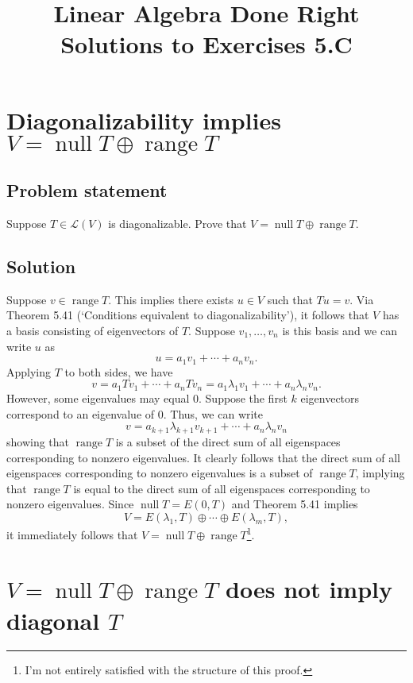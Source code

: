 \documentclass{article}
\title{Linear Algebra Done Right\\Solutions to Exercises 5.C}
\author{}
\date{}
\begin{document}
\maketitle

\section{Diagonalizability implies $V=\operatorname{null}T\oplus\operatorname{range}T$}
\subsection*{Problem statement}
Suppose $T\in\mathcal{L}(V)$ is diagonalizable. 
Prove that $V=\operatorname{null}T\oplus\operatorname{range}T$.

\subsection*{Solution}
Suppose $v\in\operatorname{range}T$. 
This implies there exists $u\in V$ such that $Tu=v$. 
Via Theorem 5.41 (`Conditions equivalent to diagonalizability'), it follows that $V$ has a basis consisting of eigenvectors of $T$. 
Suppose $v_1,\ldots,v_n$ is this basis and we can write $u$ as
\[u=a_1v_1 +\cdots +a_nv_n.\]
Applying $T$ to both sides, we have
\[v=a_1Tv_1 +\cdots +a_nTv_n=a_1\lambda_1v_1 +\cdots + a_n\lambda_n v_n.\]
However, some eigenvalues may equal $0$.
Suppose the first $k$ eigenvectors correspond to an eigenvalue of $0$. 
Thus, we can write
\[v=a_{k+1}\lambda_{k+1}v_{k+1}+\cdots+a_n\lambda_n v_n\]
showing that $\operatorname{range}T$ is a subset of the direct sum of all eigenspaces corresponding to nonzero eigenvalues. 
It clearly follows that the direct sum of all eigenspaces corresponding to nonzero eigenvalues is a subset of $\operatorname{range}T$, implying that $\operatorname{range}T$ is equal to the direct sum of all eigenspaces corresponding to nonzero eigenvalues.
Since $\operatorname{null}T=E(0,T)$ and Theorem 5.41 implies 
\[V=E(\lambda_1,T)\oplus\cdots\oplus E(\lambda_m,T),\]
it immediately follows that $V=\operatorname{null}T\oplus\operatorname{range}T$\footnote{I'm not entirely satisfied with the structure of this proof.}.

\clearpage

\section{$V=\operatorname{null}T\oplus\operatorname{range}T$ does not imply diagonal $T$}
\end{document}

